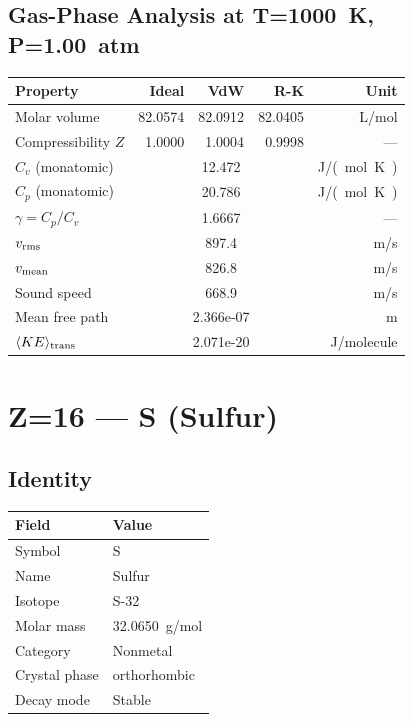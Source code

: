 \documentclass[11pt,a4paper]{article}
\begin{document}
\subsection{Gas-Phase Analysis at T=\SI{1000}{K}, P=\SI{1.00}{atm}}
\begin{tabular}{lrrrr}
  \toprule
  Property & Ideal & VdW & R-K & Unit \\
  \midrule
  Molar volume & 82.0574 & 82.0912 & 82.0405 & \si{L/mol} \\
  Compressibility $Z$ & 1.0000 & 1.0004 & 0.9998 & --- \\
  \midrule
  $C_v$ (monatomic) & \multicolumn{3}{c}{12.472} & \si{J/(mol.K)} \\
  $C_p$ (monatomic) & \multicolumn{3}{c}{20.786} & \si{J/(mol.K)} \\
  $\gamma = C_p/C_v$ & \multicolumn{3}{c}{1.6667} & --- \\
  $v_{\rm rms}$ & \multicolumn{3}{c}{897.4} & \si{m/s} \\
  $v_{\rm mean}$ & \multicolumn{3}{c}{826.8} & \si{m/s} \\
  Sound speed & \multicolumn{3}{c}{668.9} & \si{m/s} \\
  Mean free path & \multicolumn{3}{c}{2.366e-07} & \si{m} \\
  $\langle KE \rangle_{\rm trans}$ & \multicolumn{3}{c}{2.071e-20} & \si{J/molecule} \\
  \bottomrule
\end{tabular}

\newpage

\section{Z=16 --- S (Sulfur)}
\label{sec:Z16}

\subsection{Identity}
\begin{tabular}{ll}
  \toprule
  Field & Value \\
  \midrule
  Symbol & S \\
  Name & Sulfur \\
  Isotope & S-32 \\
  Molar mass & \SI{32.0650}{g/mol} \\
  Category & Nonmetal \\
  Crystal phase & orthorhombic \\
  Decay mode & Stable \\
  \bottomrule
\end{tabular}
\end{document}
